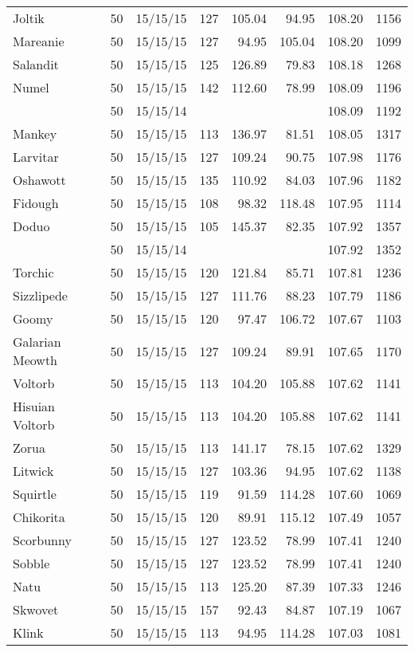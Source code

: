 \begin{longtable}{lrrrrrrr}
Joltik & 50 & 15/15/15 & 127 & 105.04 & 94.95 & 108.20 & 1156\\
Mareanie & 50 & 15/15/15 & 127 & 94.95 & 105.04 & 108.20 & 1099\\
Salandit & 50 & 15/15/15 & 125 & 126.89 & 79.83 & 108.18 & 1268\\
Numel & 50 & 15/15/15 & 142 & 112.60 & 78.99 & 108.09 & 1196\\
 & 50 & 15/15/14 & & & & 108.09 & 1192\\
Mankey & 50 & 15/15/15 & 113 & 136.97 & 81.51 & 108.05 & 1317\\
Larvitar & 50 & 15/15/15 & 127 & 109.24 & 90.75 & 107.98 & 1176\\
Oshawott & 50 & 15/15/15 & 135 & 110.92 & 84.03 & 107.96 & 1182\\
Fidough & 50 & 15/15/15 & 108 & 98.32 & 118.48 & 107.95 & 1114\\
Doduo & 50 & 15/15/15 & 105 & 145.37 & 82.35 & 107.92 & 1357\\
 & 50 & 15/15/14 & & & & 107.92 & 1352\\
Torchic & 50 & 15/15/15 & 120 & 121.84 & 85.71 & 107.81 & 1236\\
Sizzlipede & 50 & 15/15/15 & 127 & 111.76 & 88.23 & 107.79 & 1186\\
Goomy & 50 & 15/15/15 & 120 & 97.47 & 106.72 & 107.67 & 1103\\
Galarian Meowth & 50 & 15/15/15 & 127 & 109.24 & 89.91 & 107.65 & 1170\\
Voltorb & 50 & 15/15/15 & 113 & 104.20 & 105.88 & 107.62 & 1141\\
Hisuian Voltorb & 50 & 15/15/15 & 113 & 104.20 & 105.88 & 107.62 & 1141\\
Zorua & 50 & 15/15/15 & 113 & 141.17 & 78.15 & 107.62 & 1329\\
Litwick & 50 & 15/15/15 & 127 & 103.36 & 94.95 & 107.62 & 1138\\
Squirtle & 50 & 15/15/15 & 119 & 91.59 & 114.28 & 107.60 & 1069\\
Chikorita & 50 & 15/15/15 & 120 & 89.91 & 115.12 & 107.49 & 1057\\
Scorbunny & 50 & 15/15/15 & 127 & 123.52 & 78.99 & 107.41 & 1240\\
Sobble & 50 & 15/15/15 & 127 & 123.52 & 78.99 & 107.41 & 1240\\
Natu & 50 & 15/15/15 & 113 & 125.20 & 87.39 & 107.33 & 1246\\
Skwovet & 50 & 15/15/15 & 157 & 92.43 & 84.87 & 107.19 & 1067\\
Klink & 50 & 15/15/15 & 113 & 94.95 & 114.28 & 107.03 & 1081\\

\end{longtable}
